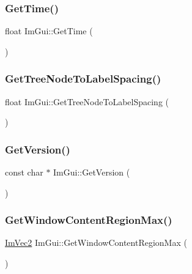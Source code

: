\subsubsection{\texorpdfstring{Get\+Time()}{GetTime()}}
{\footnotesize\ttfamily float Im\+Gui\+::\+Get\+Time (\begin{DoxyParamCaption}{ }\end{DoxyParamCaption})}

\hypertarget{namespace_im_gui_a5c89cb6b42296d0f7db75027efc0fb7a}{}\label{namespace_im_gui_a5c89cb6b42296d0f7db75027efc0fb7a} 
\subsubsection{\texorpdfstring{Get\+Tree\+Node\+To\+Label\+Spacing()}{GetTreeNodeToLabelSpacing()}}
{\footnotesize\ttfamily float Im\+Gui\+::\+Get\+Tree\+Node\+To\+Label\+Spacing (\begin{DoxyParamCaption}{ }\end{DoxyParamCaption})}

\hypertarget{namespace_im_gui_a6488c3cfa6331c8a1e93769e580ce020}{}\label{namespace_im_gui_a6488c3cfa6331c8a1e93769e580ce020} 
\subsubsection{\texorpdfstring{Get\+Version()}{GetVersion()}}
{\footnotesize\ttfamily const char $\ast$ Im\+Gui\+::\+Get\+Version (\begin{DoxyParamCaption}{ }\end{DoxyParamCaption})}

\hypertarget{namespace_im_gui_a96ce6060592d3ef975594357e650adc6}{}\label{namespace_im_gui_a96ce6060592d3ef975594357e650adc6} 
\subsubsection{\texorpdfstring{Get\+Window\+Content\+Region\+Max()}{GetWindowContentRegionMax()}}
{\footnotesize\ttfamily \hyperlink{struct_im_vec2}{Im\+Vec2} Im\+Gui\+::\+Get\+Window\+Content\+Region\+Max (\begin{DoxyParamCaption}{ }\end{DoxyParamCaption})}

